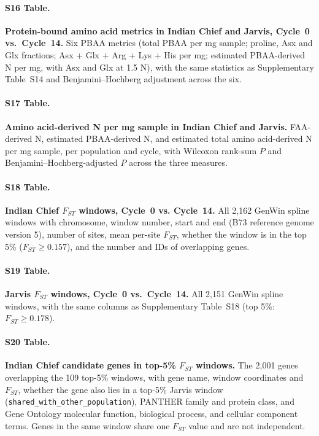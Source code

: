 \paragraph*{S16 Table.}
\makeatletter
\def\@currentlabelname{S16 Table}
\makeatother
\label{S16_Table}
\textbf{Protein-bound amino acid metrics in Indian Chief and Jarvis, Cycle~0 vs.\ Cycle~14.} Six PBAA metrics (total PBAA per mg sample; proline, Asx and Glx fractions; Asx + Glx + Arg + Lys + His per mg; estimated PBAA-derived N per mg, with Asx and Glx at 1.5 N), with the same statistics as Supplementary Table~S14 and Benjamini--Hochberg adjustment across the six.

\paragraph*{S17 Table.}
\makeatletter
\def\@currentlabelname{S17 Table}
\makeatother
\label{S17_Table}
\textbf{Amino acid-derived N per mg sample in Indian Chief and Jarvis.} FAA-derived N, estimated PBAA-derived N, and estimated total amino acid-derived N per mg sample, per population and cycle, with Wilcoxon rank-sum $P$ and Benjamini--Hochberg-adjusted $P$ across the three measures. 

\paragraph*{S18 Table.}
\makeatletter
\def\@currentlabelname{S18 Table}
\makeatother
\label{S18_Table}
\textbf{Indian Chief $F_{ST}$ windows, Cycle~0 vs. Cycle~14.} All 2,162 GenWin spline windows with chromosome, window number, start and end (B73 reference genome version 5), number of sites, mean per-site $F_{ST}$, whether the window is in the top 5\% ($F_{ST} \geq 0.157$), and the number and IDs of overlapping genes.

\paragraph*{S19 Table.}
\makeatletter
\def\@currentlabelname{S19 Table}
\makeatother
\label{S19_Table}
\textbf{Jarvis $F_{ST}$ windows, Cycle~0 vs.\ Cycle~14.} All 2,151 GenWin spline windows, with the same columns as Supplementary Table~S18 (top 5\%: $F_{ST} \geq 0.178$).

\paragraph*{S20 Table.}
\makeatletter
\def\@currentlabelname{S20 Table}
\makeatother
\label{S20_Table}
\textbf{Indian Chief candidate genes in top-5\% $F_{ST}$ windows.} The 2,001 genes overlapping the 109 top-5\% windows, with gene name, window coordinates and $F_{ST}$, whether the gene also lies in a top-5\% Jarvis window (\texttt{shared\_with\_other\_population}), PANTHER family and protein class, and Gene Ontology molecular function, biological process, and cellular component terms. Genes in the same window share one $F_{ST}$ value and are not independent.

